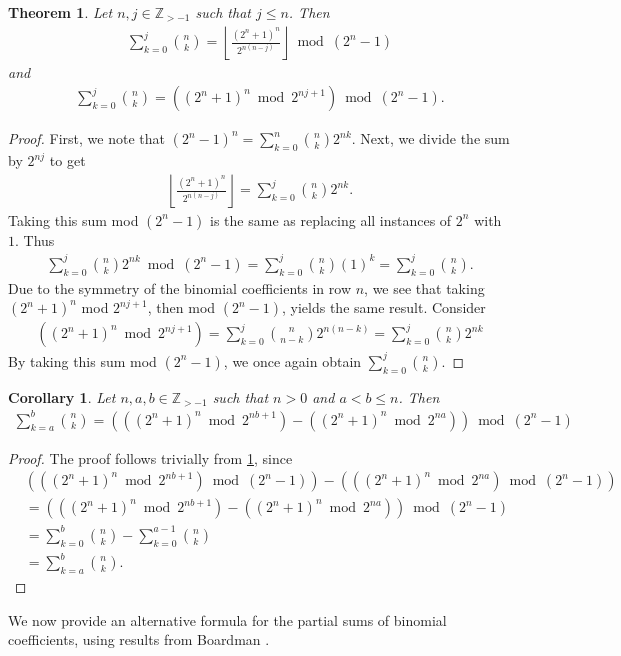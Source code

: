 \documentclass{article}
\theoremstyle{plain}
\newtheorem{corollary}{Corollary}[section]
\newtheorem{theorem}{Theorem}[section]
\newcommand{\floor}[1]{\left\lfloor #1 \right\rfloor}
\newcommand{\Z}{\mathbb{Z}}
\begin{document}
\begin{theorem} \label{proof:binomialcoeffpartialsums}
Let $n,j \in \Z_{>-1}$ such that $j \leq n$. Then
\begin{align*}
\sum_{k=0}^{j} \binom{n}{k}
= \floor{\frac{(2^n+1)^n}{2^{n(n-j)}}} \bmod (2^n-1)
\end{align*}
and
\begin{align*}
\sum_{k=0}^{j} \binom{n}{k}
= \left( (2^n+1)^n \bmod 2^{nj+1} \right) \bmod (2^n-1) .
\end{align*}
\end{theorem}
\begin{proof}
First, we note that $(2^n-1)^n = \sum_{k=0}^n \binom{n}{k} 2^{nk}$.
Next, we divide the sum by $2^{nj}$ to get
\begin{align*}
    \floor{\frac{(2^n+1)^n}{2^{n(n-j)}}}
    = \sum_{k=0}^{j} \binom{n}{k} 2^{nk} .
\end{align*}
Taking this sum mod $(2^n-1)$ is the same as replacing all instances of $2^n$ with $1$. Thus
\begin{align*}
    \sum_{k=0}^{j} \binom{n}{k} 2^{nk} \bmod (2^n-1)
    = \sum_{k=0}^{j} \binom{n}{k} (1)^{k}
    = \sum_{k=0}^{j} \binom{n}{k} .
\end{align*}
Due to the symmetry of the binomial coefficients in row $n$, we see that taking $(2^n+1)^n$ mod $2^{nj+1}$, then mod $(2^n-1)$, yields the same result. Consider
\begin{align*}
    \left( (2^n+1)^n \bmod 2^{nj+1} \right)
    = \sum_{k=0}^{j} \binom{n}{n-k} 2^{n(n-k)}
    = \sum_{k=0}^{j} \binom{n}{k} 2^{nk}
\end{align*}
By taking this sum mod $(2^n-1)$, we once again obtain $\sum_{k=0}^{j} \binom{n}{k}$.
\end{proof}

\begin{corollary}
Let $n,a,b \in \Z_{>-1}$ such that $n>0$ and $a < b \leq n$. Then
\begin{align*}
\sum_{k=a}^{b} \binom{n}{k}
=
\left(
    \left( (2^n+1)^n \bmod 2^{nb+1} \right)
    - \left( (2^n+1)^n \bmod 2^{na} \right)
\right)
\bmod (2^n-1) 
\end{align*}
\end{corollary}
\begin{proof}
The proof follows trivially from \cref{proof:binomialcoeffpartialsums}, since
\begin{align*}
& \left(\left( (2^n+1)^n \bmod 2^{nb+1} \right) \bmod (2^n-1)\right)
- \left(\left( (2^n+1)^n \bmod 2^{na} \right) \bmod (2^n-1)\right)
 \\
&= \left(
    \left( (2^n+1)^n \bmod 2^{nb+1} \right)
    - \left( (2^n+1)^n \bmod 2^{na} \right)
\right)
\bmod (2^n-1) \\
&= \sum_{k=0}^{b} \binom{n}{k} - \sum_{k=0}^{a-1} \binom{n}{k} \\
&= \sum_{k=a}^{b} \binom{n}{k} .
\end{align*}
\end{proof}
We now provide an alternative formula for the partial sums of binomial coefficients, using results from Boardman \cite{boardman2004eggdropnumbers}.
\end{document}
